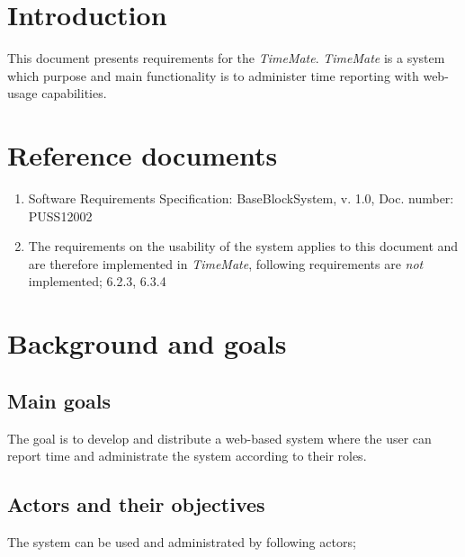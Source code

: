 \documentclass{article}
\date {#1}
\title {
    \documentNumber {01}    
    
    \documentVersion {0.2}
    
    \documentTitle {SRS - Software Requirements Specification}
    \documentGroup {2}
    
    \documentResponsible {System Group}
    \documentAuthors {System Group, UG}
    
    \documentDate {2021-02-02}
}
\begin{document}
\maketitle
\thispagestyle{empty}

\newpage

\tableofcontents

\newpage



\section{Introduction}

This document presents requirements for the \emph {TimeMate}. \emph {TimeMate} is a system which purpose and main functionality is to administer time reporting with web-usage capabilities. 


\section{Reference documents}

\begin{enumerate}
  \item Software Requirements Specification: BaseBlockSystem, v. 1.0, Doc. number: PUSS12002
  \item The requirements on the usability of the system applies to this document and are therefore implemented in \emph {TimeMate}, following requirements are \emph{not} implemented; 6.2.3, 6.3.4
  
\end{enumerate}

\section{Background and goals}
\subsection{Main goals}

The goal is to develop and distribute a web-based system where the user can report time and administrate the system according to their roles.

\subsection{Actors and their objectives}
The system can be used and administrated by following actors;
\end{document}
